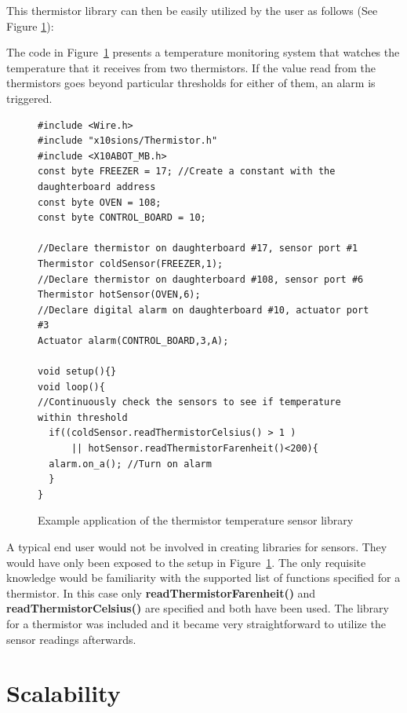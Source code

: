 This thermistor library can then be easily utilized by the user as follows (See Figure \ref{code:thermcode}):

The code in Figure~\ref{code:thermcode} presents a temperature monitoring system that watches the temperature that it receives from two thermistors. If the value read from the thermistors goes beyond particular thresholds for either of them, an alarm is triggered.
\begin{figure}
		\footnotesize
        {\fontsize{8}{6}\selectfont
		
		\begin{verbatim}
#include <Wire.h>  
#include "x10sions/Thermistor.h"
#include <X10ABOT_MB.h>
const byte FREEZER = 17; //Create a constant with the daughterboard address
const byte OVEN = 108;
const byte CONTROL_BOARD = 10;

//Declare thermistor on daughterboard #17, sensor port #1
Thermistor coldSensor(FREEZER,1);
//Declare thermistor on daughterboard #108, sensor port #6
Thermistor hotSensor(OVEN,6);
//Declare digital alarm on daughterboard #10, actuator port #3
Actuator alarm(CONTROL_BOARD,3,A);

void setup(){}
void loop(){
//Continuously check the sensors to see if temperature within threshold
  if((coldSensor.readThermistorCelsius() > 1 )
      || hotSensor.readThermistorFarenheit()<200){
  alarm.on_a(); //Turn on alarm 
  }
}
	\end{verbatim}
		}
    \caption{Example application of the thermistor temperature sensor library} \label{code:thermcode}
\end{figure}

A typical end user would not be involved in creating libraries for sensors. They would have only been exposed to the setup in Figure~\ref{code:thermcode}. The only requisite knowledge would be familiarity with the supported list of functions specified for a thermistor. In this case only \textbf{readThermistorFarenheit()} and  \textbf{readThermistorCelsius()} are specified and both have been used.
The library for a thermistor was included and it became very straightforward to utilize the sensor readings afterwards.
\newpage
\section{Scalability} %
\label{sec:scalability}

